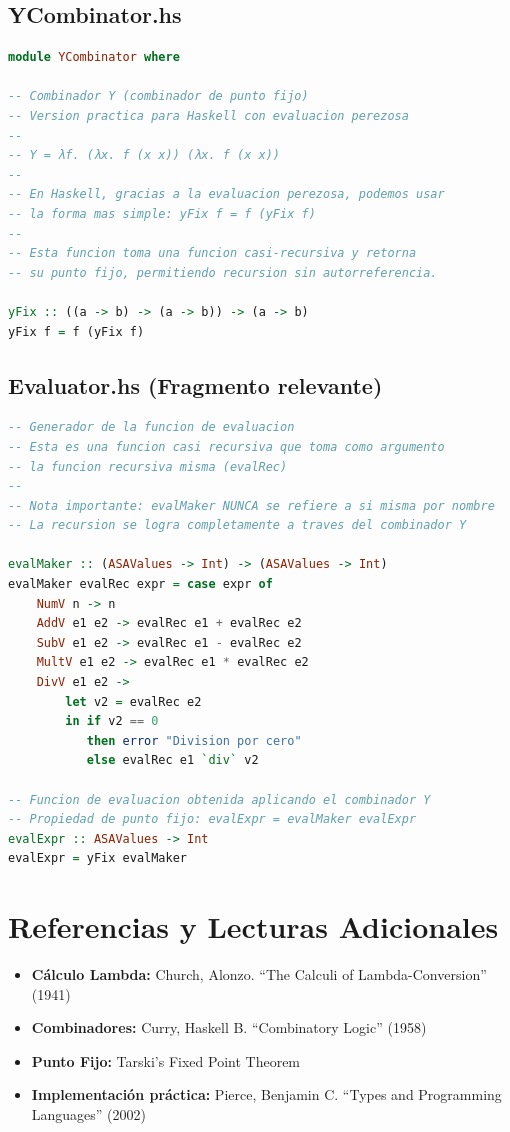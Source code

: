 \documentclass[12pt]{article}
\begin{document}
\subsection*{YCombinator.hs}

\begin{lstlisting}[language=Haskell]
module YCombinator where

-- Combinador Y (combinador de punto fijo)
-- Version practica para Haskell con evaluacion perezosa
--
-- Y = λf. (λx. f (x x)) (λx. f (x x))
--
-- En Haskell, gracias a la evaluacion perezosa, podemos usar
-- la forma mas simple: yFix f = f (yFix f)
--
-- Esta funcion toma una funcion casi-recursiva y retorna
-- su punto fijo, permitiendo recursion sin autorreferencia.

yFix :: ((a -> b) -> (a -> b)) -> (a -> b)
yFix f = f (yFix f)
\end{lstlisting}

\subsection*{Evaluator.hs (Fragmento relevante)}

\begin{lstlisting}[language=Haskell]
-- Generador de la funcion de evaluacion
-- Esta es una funcion casi recursiva que toma como argumento
-- la funcion recursiva misma (evalRec)
--
-- Nota importante: evalMaker NUNCA se refiere a si misma por nombre
-- La recursion se logra completamente a traves del combinador Y

evalMaker :: (ASAValues -> Int) -> (ASAValues -> Int)
evalMaker evalRec expr = case expr of
    NumV n -> n
    AddV e1 e2 -> evalRec e1 + evalRec e2
    SubV e1 e2 -> evalRec e1 - evalRec e2
    MultV e1 e2 -> evalRec e1 * evalRec e2
    DivV e1 e2 ->
        let v2 = evalRec e2
        in if v2 == 0
           then error "Division por cero"
           else evalRec e1 `div` v2

-- Funcion de evaluacion obtenida aplicando el combinador Y
-- Propiedad de punto fijo: evalExpr = evalMaker evalExpr
evalExpr :: ASAValues -> Int
evalExpr = yFix evalMaker
\end{lstlisting}

\section*{Referencias y Lecturas Adicionales}

\begin{itemize}
\item \textbf{Cálculo Lambda:} Church, Alonzo. ``The Calculi of Lambda-Conversion'' (1941)
\item \textbf{Combinadores:} Curry, Haskell B. ``Combinatory Logic'' (1958)
\item \textbf{Punto Fijo:} Tarski's Fixed Point Theorem
\item \textbf{Implementación práctica:} Pierce, Benjamin C. ``Types and Programming Languages'' (2002)
\end{itemize}
\end{document}
